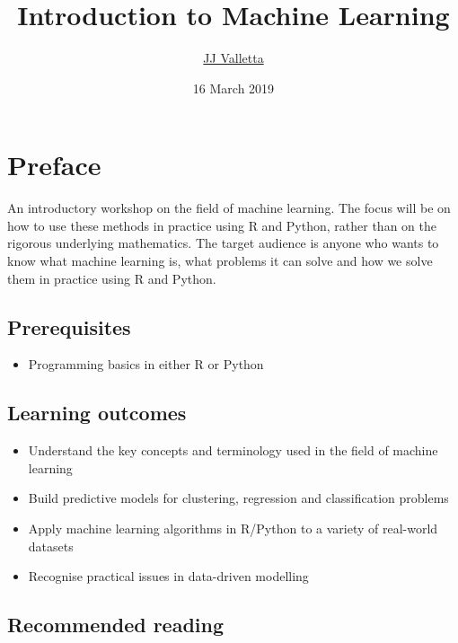 \documentclass[]{book}
\title{Introduction to Machine Learning}
\author{\href{mailto:jj.valletta@exeter.ac.uk}{JJ Valletta}}
\date{16 March 2019}
\providecommand{\tightlist}{%
  \setlength{\itemsep}{0pt}\setlength{\parskip}{0pt}}
\begin{document}
\maketitle

{
\setcounter{tocdepth}{1}
\tableofcontents
}
\hypertarget{preface}{%
\chapter*{Preface}\label{preface}}

An introductory workshop on the field of machine learning. The focus will be on how to use these methods
in practice using R and Python, rather than on the rigorous underlying mathematics. The target audience
is anyone who wants to know what machine learning is, what problems it can solve and how we solve them
in practice using R and Python.

\hypertarget{prerequisites}{%
\section*{Prerequisites}\label{prerequisites}}

\begin{itemize}
\tightlist
\item
  Programming basics in either R or Python
\end{itemize}

\hypertarget{learning-outcomes}{%
\section*{Learning outcomes}\label{learning-outcomes}}

\begin{itemize}
\tightlist
\item
  Understand the key concepts and terminology used in the field of machine learning
\item
  Build predictive models for clustering, regression and classification problems
\item
  Apply machine learning algorithms in R/Python to a variety of real-world datasets
\item
  Recognise practical issues in data-driven modelling
\end{itemize}

\hypertarget{recommended-reading}{%
\section*{Recommended reading}\label{recommended-reading}}
\end{document}
